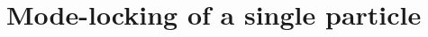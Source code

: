 \documentclass[twocolumn,preprintnumbers,amsmath,amssymb,aps,prx]{revtex4}
\begin{document}
\begin{table}[h!]
\begin{ruledtabular}
\begin{tabular}{c c c }


\end{tabular}
\end{ruledtabular}
\label{tab:1}
\end{table}

%
\section{Mode-locking of a single particle}
\label{sec:one}
\end{document}
